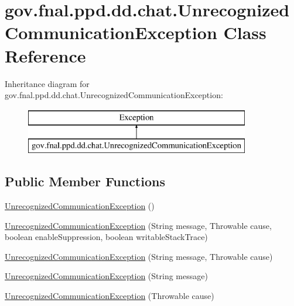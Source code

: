 \hypertarget{classgov_1_1fnal_1_1ppd_1_1dd_1_1chat_1_1UnrecognizedCommunicationException}{\section{gov.\-fnal.\-ppd.\-dd.\-chat.\-Unrecognized\-Communication\-Exception Class Reference}
\label{classgov_1_1fnal_1_1ppd_1_1dd_1_1chat_1_1UnrecognizedCommunicationException}
}
Inheritance diagram for gov.\-fnal.\-ppd.\-dd.\-chat.\-Unrecognized\-Communication\-Exception\-:\begin{figure}[H]
\begin{center}
\leavevmode
\includegraphics[height=2.000000cm]{classgov_1_1fnal_1_1ppd_1_1dd_1_1chat_1_1UnrecognizedCommunicationException}
\end{center}
\end{figure}
\subsection*{Public Member Functions}
\begin{DoxyCompactItemize}
\item 
\hyperlink{classgov_1_1fnal_1_1ppd_1_1dd_1_1chat_1_1UnrecognizedCommunicationException_a53aa2476d0747062eaad15ec00dda225}{Unrecognized\-Communication\-Exception} ()
\item 
\hyperlink{classgov_1_1fnal_1_1ppd_1_1dd_1_1chat_1_1UnrecognizedCommunicationException_accecabcfa01d30b0a7c8079f7037805c}{Unrecognized\-Communication\-Exception} (String message, Throwable cause, boolean enable\-Suppression, boolean writable\-Stack\-Trace)
\item 
\hyperlink{classgov_1_1fnal_1_1ppd_1_1dd_1_1chat_1_1UnrecognizedCommunicationException_a86375b2dc3d5a681ba40dbecbc147547}{Unrecognized\-Communication\-Exception} (String message, Throwable cause)
\item 
\hyperlink{classgov_1_1fnal_1_1ppd_1_1dd_1_1chat_1_1UnrecognizedCommunicationException_a3f3699518a3863ec7f26d50de241a8ba}{Unrecognized\-Communication\-Exception} (String message)
\item 
\hyperlink{classgov_1_1fnal_1_1ppd_1_1dd_1_1chat_1_1UnrecognizedCommunicationException_a6f719a222b339db2e010b07e539f28f2}{Unrecognized\-Communication\-Exception} (Throwable cause)
\end{DoxyCompactItemize}


